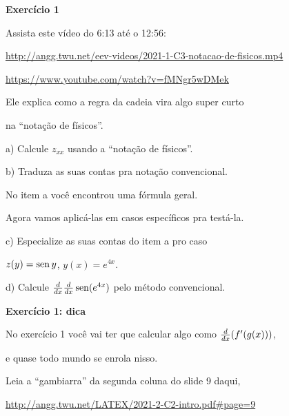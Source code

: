 \documentclass[oneside,12pt]{article}
\begin{document}
\newpage


{\bf Exercício 1}

\ssk

Assista este vídeo do 6:13 até o 12:56:

\ssk

{\footnotesize

\url{http://angg.twu.net/eev-videos/2021-1-C3-notacao-de-fisicos.mp4}

\url{https://www.youtube.com/watch?v=fMNgr5wDMek}

}

\ssk

Ele explica como a regra da cadeia vira algo super curto

na ``notação de físicos''.

\msk

a) Calcule $z_{xx}$ usando a ``notação de físicos''.

b) Traduza as suas contas pra notação convencional.

\msk

No item a você encontrou uma fórmula geral.

Agora vamos aplicá-las em casos específicos pra testá-la.

\msk

c) Especialize as suas contas do item a pro caso

\phantom{c) }$z(y) = \operatorname{sen} y$, $y(x) = e^{4x}$.

d) Calcule $\frac{d}{dx}\frac{d}{dx} \operatorname{sen}(e^{4x})$ pelo método convencional.


\newpage


{\bf Exercício 1: dica}

No exercício 1 você vai ter que calcular algo como $\frac{d}{dx}(f'(g(x)))$,

e quase todo mundo se enrola nisso.

\msk

Leia a ``gambiarra'' da segunda coluna do slide 9 daqui,

\ssk

{\footnotesize

\url{http://angg.twu.net/LATEX/2021-2-C2-intro.pdf#page=9}

}
\end{document}

